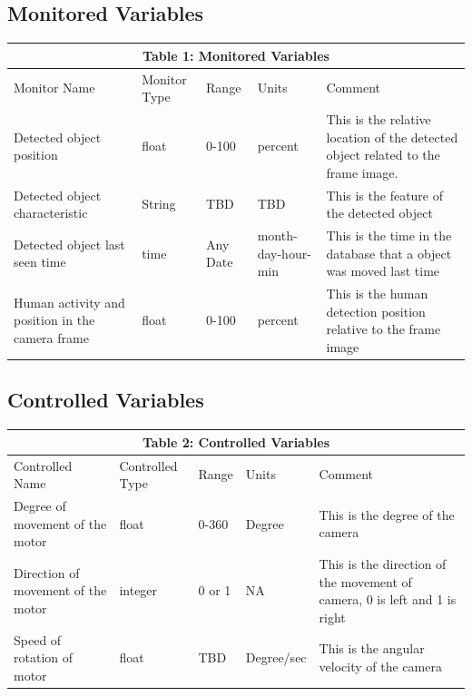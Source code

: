 \documentclass[12pt, titlepage]{article}
\begin{document}
\subsection{Monitored Variables}
\begin{tabular}{|p{}|p{}|p{}|p{}|p{}|}

\hline \multicolumn{5}{|c|}{Table 1: Monitored Variables}\\

\hline Monitor Name&Monitor Type&Range&Units &Comment\\
\hline Detected object position&float&0-100&percent&This is the relative location of the detected object related to the frame image.\\
\hline Detected object characteristic&String&TBD&TBD&This is the feature of the detected object\\
\hline Detected object last seen time&time&Any Date&month-day-hour-min&This is the time in the database that a object was moved last time\\
\hline Human activity and position in the camera frame&float&0-100&percent&This is the human detection position relative to the frame image\\



\hline

\end{tabular}
\subsection{Controlled Variables}
\begin{tabular}{|p{}|p{}|p{}|p{}|p{}|}

\hline \multicolumn{5}{|c|}{Table 2: Controlled Variables}\\

\hline Controlled Name&Controlled Type&Range&Units &Comment\\
\hline Degree of movement of the motor&float&0-360&Degree&This is the degree of the camera\\
\hline Direction of movement of the motor&integer&0 or 1&NA&This is the direction of the movement of camera, 0 is left and 1 is right\\
\hline Speed of rotation of motor&float&TBD&Degree/sec&This is the angular velocity of the camera\\


\hline

\end{tabular}
\end{document}
